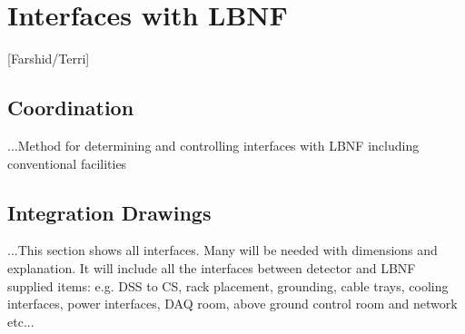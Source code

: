\chapter{Interfaces with LBNF}
\label{vl:tc-lbnf}

[Farshid/Terri]

\section{Coordination}

...Method for determining and controlling interfaces with LBNF including conventional facilities

\section{Integration Drawings}

...This section shows all interfaces. Many will be needed with
dimensions and explanation. It will include all the interfaces between
detector and LBNF supplied items: e.g. DSS to CS, rack placement,
grounding, cable trays, cooling interfaces, power interfaces, DAQ
room, above ground control room and network etc...
